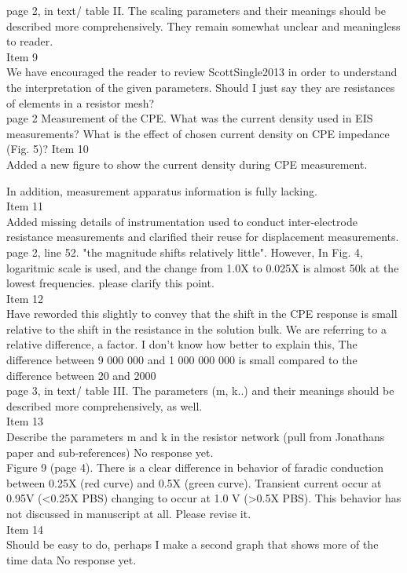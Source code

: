 \documentclass[journal, a4paper]{IEEEtran}
\begin{document}
{{page 2, in text/ table II. The scaling parameters and their meanings should be described more comprehensively. They remain somewhat unclear and meaningless to reader.\\
{\color{OliveGreen}
    Item 9\\
    We have encouraged the reader to review ScottSingle2013 in order to understand the interpretation of the given parameters. {\color{red} Should I just say they are resistances of elements in a resistor mesh?}
}\\

page 2 Measurement of the CPE. What was the current density used in EIS measurements?
What is the effect of chosen current density on CPE impedance (Fig. 5)?
{\color{OliveGreen}
    Item 10\\
    Added a new figure to show the current density during CPE measurement.
}

In addition,  measurement apparatus information is fully lacking.\\
{\color{OliveGreen}
    Item 11\\
    Added missing details of instrumentation used to conduct inter-electrode resistance measurements and clarified their reuse for displacement measurements.
}\\

page 2, line 52. "the magnitude shifts relatively little". However, In Fig. 4, logaritmic scale is used, and the change from 1.0X to 0.025X is almost 50k at the lowest frequencies. 
please clarify this point.\\
{\color{OliveGreen}
    Item 12\\
    Have reworded this slightly to convey that the shift in the CPE response is small relative to the shift in the resistance in the solution bulk. We are referring to a relative difference, a factor.
    {\color{red} I don't know how better to explain this, The difference between 9 000 000 and 1 000 000 000 is small compared to the difference between 20 and 2000}
}\\

page 3, in text/ table III. The parameters (m, k..) and their meanings should be described more comprehensively, as well.\\
{\color{OliveGreen} 
    Item 13\\
    {\color{Red} Describe the parameters m and k in the resistor network (pull from Jonathans paper and sub-references)}
    No response yet.
}\\

Figure 9 (page 4). There is a clear difference in behavior of faradic conduction between 0.25X (red curve) and 0.5X (green curve). Transient current occur at 0.95V (<0.25X PBS) changing to occur at 1.0 V (>0.5X PBS). This behavior has not discussed in manuscript at all. Please revise it.\\
{\color{OliveGreen}
    Item 14\\
    {\color{Red} Should be easy to do, perhaps I make a second graph that shows more of the time data}
    No response yet.
}\\

}}
\end{document}
